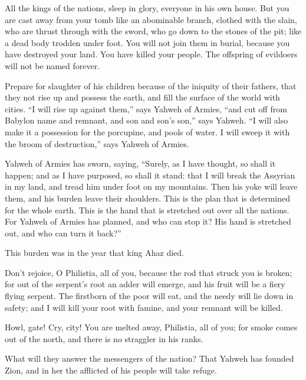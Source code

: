 {\par }{\PP {}All the kings of the nations, sleep in glory, everyone in his own house.
But you are cast away from your tomb like an abominable branch, clothed with the slain, who are thrust through with the sword, who go down to the stones of the pit; like a dead body trodden under foot.
You will not join them in burial, because you have destroyed your land. You have killed your people. The offspring of evildoers will not be named forever.
\par }{\PP {}Prepare for slaughter of his children because of the iniquity of their fathers, that they not rise up and possess the earth, and fill the surface of the world with cities.
“I will rise up against them,” says Yahweh of Armies, “and cut off from Babylon name and remnant, and son and son’s son,” says Yahweh.
“I will also make it a possession for the porcupine, and pools of water. I will sweep it with the broom of destruction,” says Yahweh of Armies.
\par }{\PP {}Yahweh of Armies has sworn, saying, “Surely, as I have thought, so shall it happen; and as I have purposed, so shall it stand:
that I will break the Assyrian in my land, and tread him under foot on my mountains. Then his yoke will leave them, and his burden leave their shoulders.
This is the plan that is determined for the whole earth. This is the hand that is stretched out over all the nations.
For Yahweh of Armies has planned, and who can stop it? His hand is stretched out, and who can turn it back?”
\par }{\PP {}This burden was in the year that king Ahaz died.
\par }{\PP {}Don’t rejoice, O Philistia, all of you, because the rod that struck you is broken; for out of the serpent’s root an adder will emerge, and his fruit will be a fiery flying serpent.
The firstborn of the poor will eat, and the needy will lie down in safety; and I will kill your root with famine, and your remnant will be killed.
\par }{\PP {}Howl, gate! Cry, city! You are melted away, Philistia, all of you; for smoke comes out of the north, and there is no straggler in his ranks.
\par }{\PP {}What will they answer the messengers of the nation? That Yahweh has founded Zion, and in her the afflicted of his people will take refuge.

}
